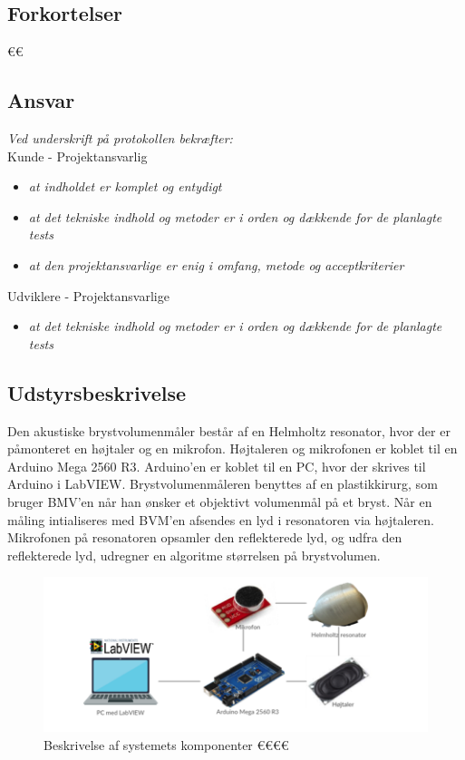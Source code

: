 		\subsection{Forkortelser}
		€€
		  
		\subsection{Ansvar}
		\textit{		Ved underskrift på protokollen bekræfter: }\\
		
		Kunde - Projektansvarlig
		\begin{itemize}
			\item \textit{at indholdet er komplet og entydigt}
			\item \textit{at det tekniske indhold og metoder er i orden og dækkende for de planlagte tests}
			\item \textit{at den projektansvarlige er enig i omfang, metode og acceptkriterier}
		\end{itemize}
		
		Udviklere - Projektansvarlige
		\begin{itemize}
			\item \textit{at det tekniske indhold og metoder er i orden og dækkende for de planlagte tests}
		\end{itemize}
		
		\subsection{Udstyrsbeskrivelse}
		Den akustiske brystvolumenmåler består af en Helmholtz resonator, hvor der er påmonteret en højtaler og en mikrofon. Højtaleren og mikrofonen er koblet til en Arduino Mega 2560 R3. Arduino'en er koblet til en PC, hvor der skrives til Arduino i LabVIEW. 
		Brystvolumenmåleren benyttes af en plastikkirurg, som bruger BMV'en når han ønsker et objektivt volumenmål på et bryst. Når en måling intialiseres med BVM'en afsendes en lyd i resonatoren via højtaleren. Mikrofonen på resonatoren opsamler den reflekterede lyd, og udfra den reflekterede lyd, udregner en algoritme størrelsen på brystvolumen. 			
		\begin{figure}[htb]
			\centering
			\includegraphics[width=5in]{systembeskrivelse}
			\caption{Beskrivelse af systemets komponenter €€€€}
			\label{system}
		\end{figure}
		
